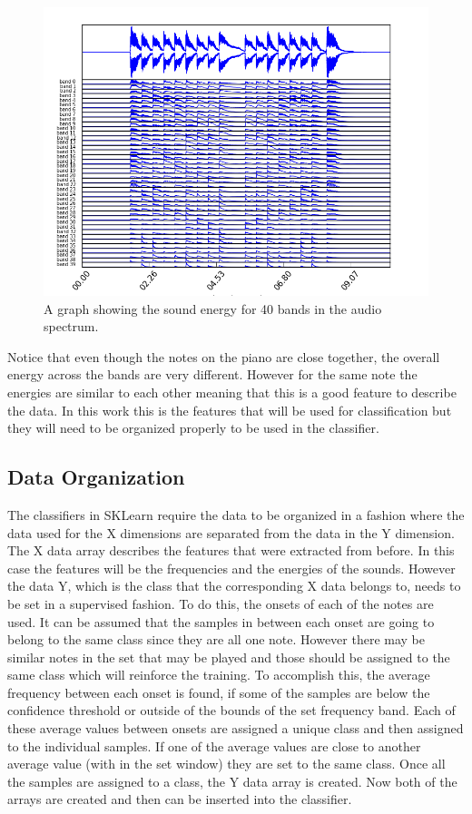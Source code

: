 \documentclass[conference]{IEEEtran}
\begin{document}
\begin{figure}[htb]
\centering 
\includegraphics[width=.48\textwidth]{energy.png}
\caption{A graph showing the sound energy for 40 bands in the audio spectrum.}
\vspace*{-20pt}
\label{fig:energy}
\end{figure}

Notice that even though the notes on the piano are close together, the overall energy across the bands are very different.  However for the same note the energies are similar to each other meaning that this is a good feature to describe the data.  In this work this is the features that will be used for classification but they will need to be organized properly to be used in the classifier.

\subsection{Data Organization}
\label{sec:org}

The classifiers in SKLearn require the data to be organized in a fashion where the data used for the X dimensions are separated from the data in the Y dimension.  The X data array describes the features that were extracted from before.  In this case the features will be the frequencies and the energies of the sounds.   However the data Y, which is the class that the corresponding X data belongs to, needs to be set in a supervised fashion.  To do this, the onsets of each of the notes are used.  It can be assumed that the samples in between each onset are going to belong to the same class since they are all one note.  However there may be similar notes in the set that may be played and those should be assigned to the same class which will reinforce the training.   To accomplish this, the average frequency between each onset is found, if some of the samples are below the confidence threshold or outside of the bounds of the set frequency band.  Each of these average values between onsets are assigned a unique class and then assigned to the individual samples.  If one of the average values are close to another average value (with in the set window) they are set to the same class.  Once all the samples are assigned to a class, the Y data array is created.  Now both of the arrays are created and then can be inserted into the classifier.  
\end{document}
